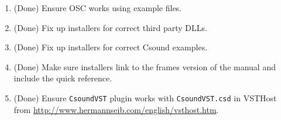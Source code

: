 \documentclass[11pt,letterpaper,onecolumn]{scrartcl}
\begin{document}
\begin{sloppypar}
\begin{enumerate}
	\item (Done) Ensure OSC works using example files.
	\item (Done) Fix up installers for correct third party DLLs.
	\item (Done) Fix up installers for correct Csound examples.
	\item (Done) Make sure installers link to the frames version of the manual and include the quick reference.
	\item (Done) Ensure \texttt{CsoundVST} plugin works with \texttt{CsoundVST.csd} in VSTHost from \url{http://www.hermannseib.com/english/vsthost.htm}.
\end{enumerate}

\end{sloppypar}
\end{document}
